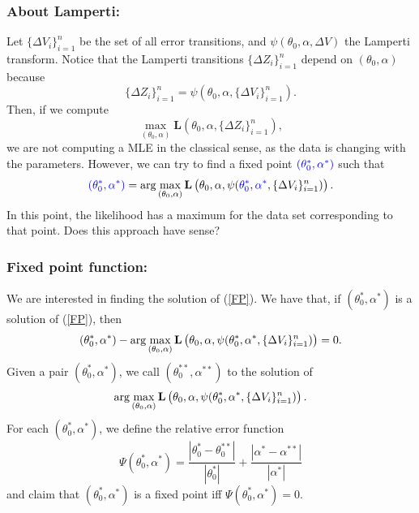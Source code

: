 \documentclass[aspectratio=169]{beamer}\usepackage[utf8]{inputenc}
\begin{document}

\begin{frame}\frametitle{About Lamperti:}

Let $\{\Delta V_i\}_{i=1}^n$ be the set of all error transitions, and $\psi(\theta_0,\alpha,\Delta V)$ the Lamperti transform. Notice that the Lamperti transitions $\{\Delta Z_i\}_{i=1}^n$ depend on $(\theta_0,\alpha)$ because $$\{\Delta Z_i\}_{i=1}^n=\psi(\theta_0,\alpha,\{\Delta V_i\}_{i=1}^n).$$
Then, if we compute $$\max_{(\theta_0,\alpha)}\mathbf{L}(\theta_0,\alpha,\{\Delta Z_i\}_{i=1}^n),$$
we are not computing a MLE in the classical sense, as the data is changing with the parameters. However, we can try to find a fixed point ${\color{blue}(\theta_0^*,\alpha^*)}$ such that
\begin{equation}
{\color{blue}(\theta_0^*,\alpha^*)}=\arg\max_{(\theta_0,\alpha)}\mathbf{L}\left(\theta_0,\alpha,\psi({\color{blue}\theta_0^*},{\color{blue}\alpha^*},\{\Delta V_i\}_{i=1}^n)\right).
\label{FP}
\end{equation}
In this point, the likelihood has a maximum for the data set corresponding to that point. \alert{Does this approach have sense?}

\end{frame}


\begin{frame}\frametitle{Fixed point function:}

We are interested in finding the solution of (\ref{FP}). We have that, if $(\theta_0^*,\alpha^*)$ is a solution of (\ref{FP}), then
\begin{equation*}
(\theta_0^*,\alpha^*)-\arg\max_{(\theta_0,\alpha)}\mathbf{L}\left(\theta_0,\alpha,\psi({\color{black}\theta_0^*},{\color{black}\alpha^*},\{\Delta V_i\}_{i=1}^n)\right)=0.
\end{equation*}
Given a pair $(\theta_0^{*},\alpha^{*})$, we call $(\theta_0^{**},\alpha^{**})$ to the solution of
\begin{equation*}
\arg\max_{(\theta_0,\alpha)}\mathbf{L}\left(\theta_0,\alpha,\psi({\color{black}\theta_0^*},{\color{black}\alpha^*},\{\Delta V_i\}_{i=1}^n)\right).
\end{equation*}
For each $(\theta_0^{*},\alpha^{*})$, we define the relative error function
\begin{equation*}
\Psi(\theta_0^{*},\alpha^{*})=\frac{|\theta_0^{*}-\theta_0^{**}|}{|\theta_0^{*}|}+\frac{|\alpha^{*}-\alpha^{**}|}{|\alpha^{*}|}
\end{equation*}
and claim that $(\theta_0^*,\alpha^*)$ is a fixed point iff $\Psi(\theta_0^*,\alpha^*)=0$.

\end{frame}
\end{document}
